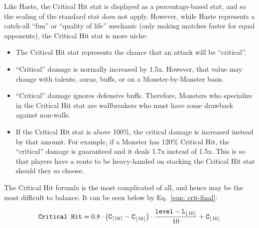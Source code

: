 








Like Haste, the Critical Hit stat is displayed as a percentage-based stat, and so the scaling of the standard stat does not apply. However, while Haste represents a catch-all ``fun'' or ``quality of life'' mechanic (only making matches faster for equal opponents), the Critical Hit stat is more niche:

\begin{itemize}
	\item{The Critical Hit stat represents the chance that an attack will be ``critical''.}
	\item{``Critical'' damage is normally increased by 1.5x. However, that value may change with talents, auras, buffs, or on a Monster-by-Monster basis.}
	\item{``Critical'' damage ignores defensive buffs. Therefore, Monsters who specialize in the Critical Hit stat are wallbreakers who must have some drawback against non-walls.}
	\item{If the Critical Hit stat is above 100\%, the critical damage is increased instead by that amount. For example, if a Monster has 120\% Critical Hit, the ``critical'' damage is guaranteed and it deals 1.7x instead of 1.5x. This is so that players have a route to be heavy-handed on stacking the Critical Hit stat should they so choose.}
\end{itemize}

The Critical Hit forumla is the most complicated of all, and hence may be the most difficult to balance. It can be seen below by Eq.~\eqref{eqn: crit-final}:

\begin{equation}\label{eqn: crit-final}
\texttt{Critical Hit} =  
		0.8 \cdot 
		\left(\texttt{C}_{\lceil10\rceil} - \texttt{C}_{\lfloor10\rfloor}\right) \cdot
		\frac{\texttt{level} - \texttt{L}_{\lfloor10\rfloor}}{10} +
		\texttt{C}_{\lfloor10\rfloor}
\end{equation}

